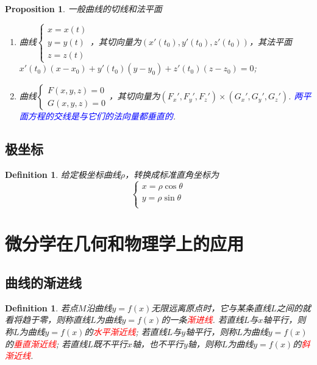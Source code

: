 \documentclass{article}
\newtheorem{proposition}[theorem]{Proposition}
\newtheorem{definition}[theorem]{Definition}
\newcommand{\redt}[1]{\textcolor{red}{#1}}
\newcommand{\bluet}[1]{\textcolor{blue}{#1}}
\begin{document}
\begin{proposition}
\rm 一般曲线的切线和法平面
\begin{enumerate}
	\item 曲线$\left\{ \begin{array}{ll} x=x(t) \\ y=y(t) \\ z=z(t) \end{array}	 \right.$，其切向量为$(x'(t_0),y'(t_0),z'(t_0))$，其法平面$x'(t_0)(x-x_0)+y'(t_0)(y-y_0) + z'(t_0)(z-z_0) = 0$; 
	\item 曲线$\left\{ \begin{array}{ll} F(x,y,z) = 0 \\ G(x,y,z) = 0 \end{array} \right.$，其切向量为$(F_x',F_y',F_z') \times (G_x',G_y',G_z')$. \bluet{两平面方程的交线是与它们的法向量都垂直的}. 
\end{enumerate}
\end{proposition}

\subsection{极坐标}

\begin{definition}
\rm 给定极坐标曲线$\rho$，转换成标准直角坐标为
$$
\left\{
\begin{array}{ll}
x = \rho \cos \theta \\
y = \rho \sin \theta \\
\end{array} \right.
$$
\end{definition}




\newpage
\section{微分学在几何和物理学上的应用}

\subsection{曲线的渐进线}

\begin{definition}
\rm 若点$M$沿曲线$y=f(x)$无限远离原点时，它与某条直线$L$之间的就看将趋于零，则称直线$L$为曲线$y=f(x)$的一条\redt{渐进线}. 若直线$L$与$x$轴平行，则称$L$为曲线$y=f(x)$的\redt{水平渐近线}; 若直线$L$与$y$轴平行，则称$L$为曲线$y=f(x)$的\redt{垂直渐近线}; 若直线$L$既不平行$x$轴，也不平行$y$轴，则称$L$为曲线$y=f(x)$的\redt{斜渐近线}. 
\end{definition}
\end{document}
